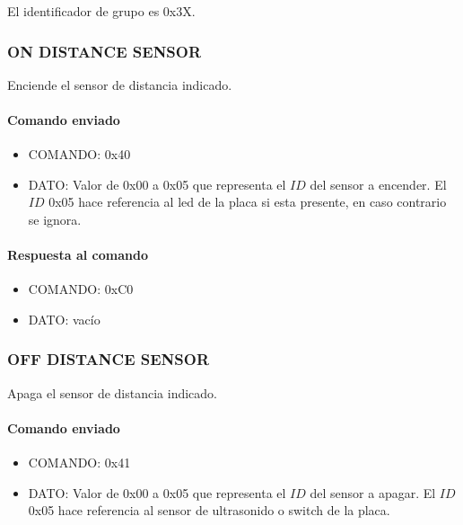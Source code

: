 El identificador de grupo es 0x3X.

\subsubsection{ON DISTANCE SENSOR}
\label{hA_protocolo_on_distance_sensor}

Enciende el sensor de distancia indicado.

\paragraph*{Comando enviado}

\begin{itemize}
	\item{COMANDO:} 0x40
	\item{DATO:} Valor de 0x00 a 0x05 que representa el $ID$ del sensor a encender.
	El $ID$ 0x05 hace referencia al led de la placa si esta presente, en caso contrario se ignora.
\end{itemize}

\paragraph*{Respuesta al comando}

\begin{itemize}
	\item{COMANDO:} 0xC0
	\item{DATO:} vac\'io
\end{itemize}

\subsubsection{OFF DISTANCE SENSOR}
\label{hA_protocolo_off_distance_sensor}

Apaga el sensor de distancia indicado.

\paragraph*{Comando enviado}

\begin{itemize}
	\item{COMANDO:} 0x41
	\item{DATO:} Valor de 0x00 a 0x05 que representa el $ID$ del sensor a apagar.
	El $ID$ 0x05 hace referencia al sensor de ultrasonido o switch de la placa.
\end{itemize}

